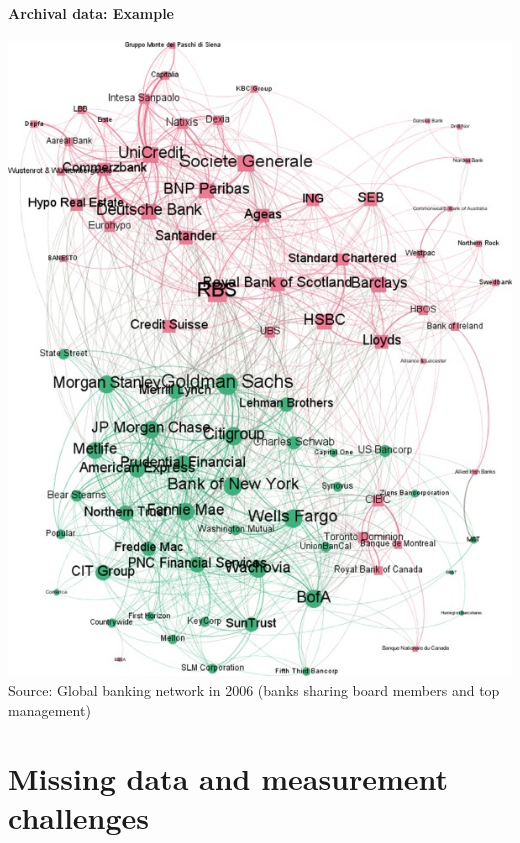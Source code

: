 \documentclass[8pt]{beamer}
\begin{document}
\begin{frame}
\frametitle{\insertsection}
\framesubtitle{Archival data: Example}

\centering
\includegraphics[height = 0.8\textheight]{banking}\\
\tiny{Source: Global banking network in 2006 (banks sharing board members and top management)\citep{Houston2018}}

\end{frame}







\section{Missing data and measurement challenges}
\end{document}
